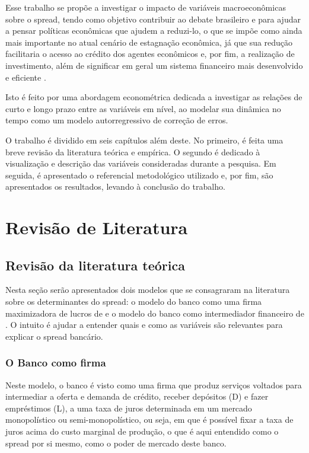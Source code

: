 \documentclass[a4paper,
               article,
               12pt,
               openany,
               oneside,
               english,
               brazil]{abntex2}
\numberwithin{equation}{section}
\begin{document}
    Esse trabalho se propõe a investigar o impacto de variáveis macroeconômicas sobre o spread, tendo como objetivo contribuir ao debate brasileiro e para ajudar a pensar políticas econômicas que ajudem a reduzi-lo, o que se impõe como ainda mais importante no atual cenário de estagnação econômica, já que sua redução facilitaria o acesso ao crédito dos agentes econômicos e, por fim, a realização de investimento, além de significar em geral um sistema financeiro mais desenvolvido e eficiente \cite[p.~8]{manhica12}.

    Isto é feito por uma abordagem econométrica dedicada a investigar as relações de curto e longo prazo entre as variáveis em nível, ao modelar sua dinâmica no tempo como um modelo autorregressivo de correção de erros.

    O trabalho é dividido em seis capítulos além deste. No primeiro, é feita uma breve revisão da literatura teórica e empírica. O segundo é dedicado à visualização e descrição das variáveis consideradas durante a pesquisa. Em seguida, é apresentado o referencial metodológico utilizado e, por fim, são apresentados os resultados, levando à conclusão do trabalho.


\section{Revisão de Literatura}
\subsection{Revisão da literatura teórica}

    Nesta seção serão apresentados dois modelos que se consagraram na literatura sobre os determinantes do spread: o modelo do banco como uma firma maximizadora de lucros de \textcite{klein} e o modelo do banco como intermediador financeiro de \textcite{hoesaunders}. O intuito é ajudar a entender quais e como as variáveis são relevantes para explicar o spread bancário.

\subsubsection{O Banco como firma}

    Neste modelo, o banco é visto como uma firma que produz serviços voltados para intermediar a oferta e demanda de crédito, receber depósitos (D) e fazer empréstimos (L), a uma taxa de juros determinada em um mercado monopolístico ou semi-monopolístico, ou seja, em que é possível fixar a taxa de juros acima do custo marginal de produção, o que é aqui entendido como o spread por si mesmo, como o poder de mercado deste banco. \cite{oreiro}
\end{document}
